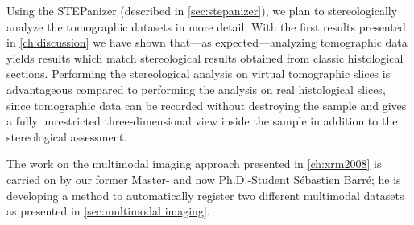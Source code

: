 Using the STEPanizer (described in \autoref{sec:stepanizer}), we plan to stereologically analyze the tomographic datasets in more detail. With the first results presented in \autoref{ch:discussion} we have shown that---as expected---analyzing tomographic data yields results which match stereological results obtained from classic histological sections. Performing the stereological analysis on virtual tomographic slices is advantageous compared to performing the analysis on real histological slices, since tomographic data can be recorded without destroying the sample and gives a fully unrestricted three-dimensional view inside the sample in addition to the stereological assessment.

The work on the multimodal imaging approach presented in \autoref{ch:xrm2008} is carried on by our former Master- and now Ph.D.-Student Sébastien Barré; he is developing a method to automatically register two different multimodal datasets as presented in \autoref{sec:multimodal imaging}.